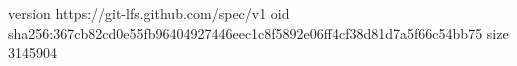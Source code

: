 version https://git-lfs.github.com/spec/v1
oid sha256:367cb82cd0e55fb96404927446eec1c8f5892e06ff4cf38d81d7a5f66c54bb75
size 3145904
